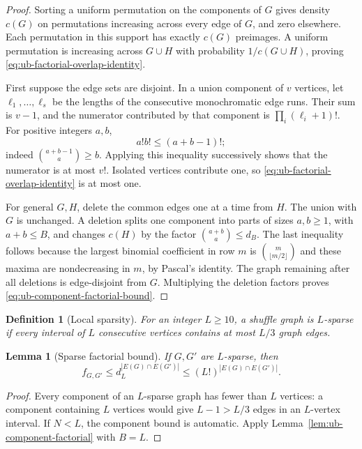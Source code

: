 \documentclass[11pt]{article}
\numberwithin{equation}{section}
\newtheorem{lemma}[lemma]{Lemma}
\newtheorem{definition}[definition]{Definition}
\newcommand{\1}{\mathbf 1}
\begin{document}
\begin{proof}
Sorting a uniform permutation on the components of $G$ gives density
$c(G)$ on permutations increasing across every edge of $G$, and zero
elsewhere. Each permutation in this support has exactly $c(G)$
preimages. A uniform permutation is increasing across $G\cup H$ with
probability $1/c(G\cup H)$, proving
\eqref{eq:ub-factorial-overlap-identity}.

First suppose the edge sets are disjoint. In a union component of $v$
vertices, let $\ell_1,\ldots,\ell_s$ be the lengths of the consecutive
monochromatic edge runs. Their sum is $v-1$, and the numerator contributed
by that component is $\prod_i(\ell_i+1)!$. For positive integers $a,b$,
\[
 a!b!\le(a+b-1)!;
\]
indeed $\binom{a+b-1}{a}\ge b$. Applying this inequality successively
shows that the numerator is at most $v!$. Isolated vertices contribute
one, so \eqref{eq:ub-factorial-overlap-identity} is at most one.

For general $G,H$, delete the common edges one at a time from $H$.
The union with $G$ is unchanged. A deletion splits one component into
parts of sizes $a,b\ge1$, with $a+b\le B$, and changes $c(H)$ by the
factor $\binom{a+b}{a}\le d_B$. The last inequality follows because the
largest binomial coefficient in row $m$ is
$\binom m{\lfloor m/2\rfloor}$ and these maxima are nondecreasing in
$m$, by Pascal's identity. The graph remaining after all deletions is
edge-disjoint from $G$. Multiplying the deletion factors proves
\eqref{eq:ub-component-factorial-bound}.
\end{proof}

\begin{definition}[Local sparsity]
\label{def:local-sparsity}
For an integer $L\ge10$, a shuffle graph is $L$-sparse if every interval
of $L$ consecutive vertices contains at most $L/3$ graph edges.
\end{definition}

\begin{lemma}[Sparse factorial bound]
\label{lem:ub-sparse-factorial}
If $G,G'$ are $L$-sparse, then
\[
 f_{G,G'}\le d_L^{|E(G)\cap E(G')|}
            \le(L!)^{|E(G)\cap E(G')|}.
\]
\end{lemma}

\begin{proof}
Every component of an $L$-sparse graph has fewer than $L$ vertices:
a component containing $L$ vertices would give $L-1>L/3$ edges in an
$L$-vertex interval. If $N<L$, the component bound is automatic.
Apply Lemma~\ref{lem:ub-component-factorial} with $B=L$.
\end{proof}
\end{document}
